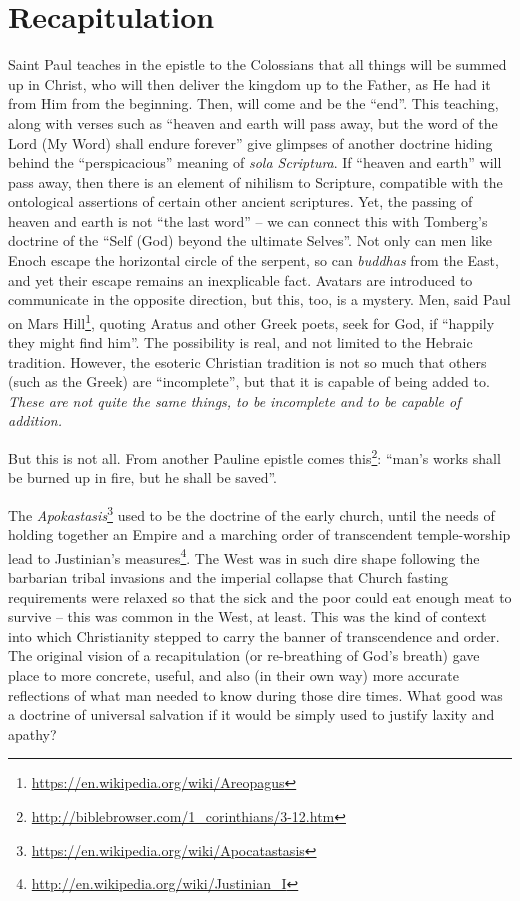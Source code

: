 \section{Recapitulation}

Saint Paul teaches in the epistle to the Colossians that all things will be summed up in Christ, who will then deliver the kingdom up to the Father, as He had it from Him from the beginning. Then, will come and be the ``end''. This teaching, along with verses such as ``heaven and earth will pass away, but the word of the Lord (My Word) shall endure forever'' give glimpses of another doctrine hiding behind the ``perspicacious'' meaning of \emph{sola Scriptura}. If ``heaven and earth'' will pass away, then there is an element of nihilism to Scripture, compatible with the ontological assertions of certain other ancient scriptures. Yet, the passing of heaven and earth is not ``the last word'' -- we can connect this with Tomberg's doctrine of the ``Self (God) beyond the ultimate Selves''. Not only can men like Enoch escape the horizontal circle of the serpent, so can \emph{buddhas} from the East, and yet their escape remains an inexplicable fact. Avatars are introduced to communicate in the opposite direction, but this, too, is a mystery. Men, said Paul on Mars Hill\footnote{\url{https://en.wikipedia.org/wiki/Areopagus}}, quoting Aratus and other Greek poets, seek for God, if ``happily they might find him''. The possibility is real, and not limited to the Hebraic tradition. However, the esoteric Christian tradition is not so much that others (such as the Greek) are ``incomplete'', but that it is capable of being added to. \emph{These are not quite the same things, to be incomplete and to be capable of addition.}

But this is not all. From another Pauline epistle comes this\footnote{\url{http://biblebrowser.com/1\_corinthians/3-12.htm}}: ``man's works shall be burned up in fire, but he shall be saved''.

The \emph{Apokastasis}\footnote{\url{https://en.wikipedia.org/wiki/Apocatastasis}} used to be the doctrine of the early church, until the needs of holding together an Empire and a marching order of transcendent temple-worship lead to Justinian's measures\footnote{\url{http://en.wikipedia.org/wiki/Justinian\_I}}. The West was in such dire shape following the barbarian tribal invasions and the imperial collapse that Church fasting requirements were relaxed so that the sick and the poor could eat enough meat to survive -- this was common in the West, at least. This was the kind of context into which Christianity stepped to carry the banner of transcendence and order. The original vision of a recapitulation (or re-breathing of God's breath) gave place to more concrete, useful, and also (in their own way) more accurate reflections of what man needed to know during those dire times. What good was a doctrine of universal salvation if it would be simply used to justify laxity and apathy?

